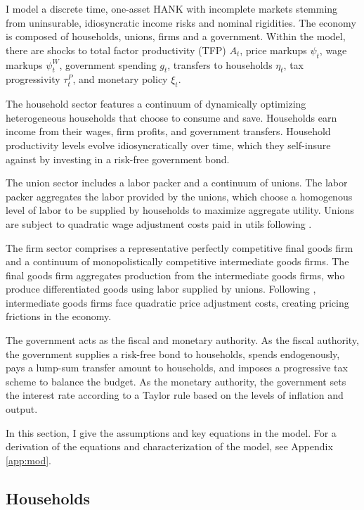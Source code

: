 I model a discrete time, one-asset HANK with incomplete markets stemming from uninsurable, idiosyncratic income risks and nominal rigidities. The economy is composed of households, unions, firms and a government. Within the model, there are shocks to total factor productivity (TFP) $A_t$, price markups $\psi_t$, wage markups $\psi_t^W$, government spending $g_t$, transfers to households $\eta_t$, tax progressivity $\tau^P_t$, and monetary policy $\xi_t$.

The household sector features a continuum of dynamically optimizing heterogeneous households that choose to consume and save. Households earn income from their wages, firm profits, and government transfers. Household productivity levels evolve idiosyncratically over time, which they self-insure against by investing in a risk-free government bond.

The union sector includes a labor packer and a continuum of unions. The labor packer aggregates the labor provided by the unions, which choose a homogenous level of labor to be supplied by households to maximize aggregate utility. Unions are subject to quadratic wage adjustment costs paid in utils following \textcite{auclert2023mpcs}.

The firm sector comprises a representative perfectly competitive final goods firm and a continuum of monopolistically competitive intermediate goods firms. The final goods firm aggregates production from the intermediate goods firms, who produce differentiated goods using labor supplied by unions. Following \textcite{rotemberg1982sticky}, intermediate goods firms face quadratic price adjustment costs, creating pricing frictions in the economy.

The government acts as the fiscal and monetary authority. As the fiscal authority, the government supplies a risk-free bond to households, spends endogenously, pays a lump-sum transfer amount to households, and imposes a progressive tax scheme to balance the budget. As the monetary authority, the government sets the interest rate according to a Taylor rule based on the levels of inflation and output.

In this section, I give the assumptions and key equations in the model. For a derivation of the equations and characterization of the model, see Appendix \ref{app:mod}.


\subsection{Households} \label{subsec:hh}

